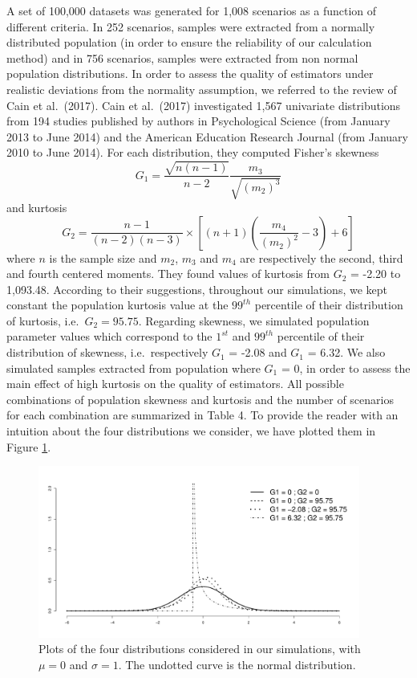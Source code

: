\documentclass[
  english,
  man,floatsintext]{apa6}
\begin{document}
A set of 100,000 datasets was generated for 1,008 scenarios as a function of different criteria. In 252 scenarios, samples were extracted from a normally distributed population (in order to ensure the reliability of our calculation method) and in 756 scenarios, samples were extracted from non normal population distributions. In order to assess the quality of estimators under realistic deviations from the normality assumption, we referred to the review of Cain et al.~(2017). Cain et al.~(2017) investigated 1,567 univariate distributions from 194 studies published by authors in Psychological Science (from January 2013 to June 2014) and the American Education Research Journal (from January 2010 to June 2014). For each distribution, they computed Fisher's skewness
\[G_{1}=\frac{\sqrt{n(n-1)}}{n-2} \frac{m_{3}}{\sqrt{(m_{2})^3}}\]
and kurtosis \[G_{2}=\frac{n-1}{(n-2)(n-3)}\times \left[(n+1)\left(\frac{m_{4}}{(m_{2})^2}-3\right)+6\right]\]
where \(n\) is the sample size and \(m_{2}\), \(m_{3}\) and \(m_{4}\) are respectively the second, third and fourth centered moments. They found values of kurtosis from \(G_2\) = -2.20 to 1,093.48. According to their suggestions, throughout our simulations, we kept constant the population kurtosis value at the \(99^{th}\) percentile of their distribution of kurtosis, i.e.~\(G_2=95.75\). Regarding skewness, we simulated population parameter values which correspond to the \(1^{st}\) and \(99^{th}\) percentile of their distribution of skewness, i.e.~respectively \(G_1\) = -2.08 and \(G_1\) = 6.32. We also simulated samples extracted from population where \(G_1\) = 0, in order to assess the main effect of high kurtosis on the quality of estimators. All possible combinations of population skewness and kurtosis and the number of scenarios for each combination are summarized in Table 4. To provide the reader with an intuition about the four distributions we consider, we have plotted them in Figure \ref{fig:DISTR}.

\begin{figure}
\includegraphics[width=400px]{ES_files/figure-latex/DISTR-1} \caption{Plots of the four distributions considered in our simulations, with $\mu=0$ and $\sigma=1$. The undotted curve is the normal distribution.}\label{fig:DISTR}
\end{figure}
\end{document}
